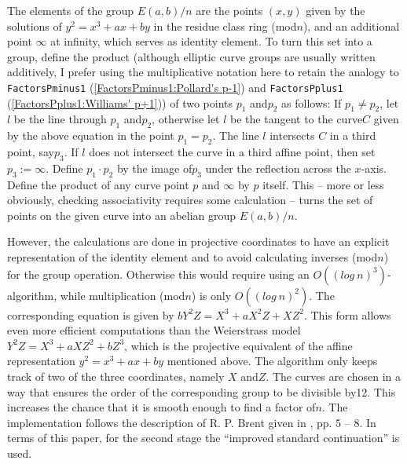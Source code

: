 \documentclass[a4paper,11pt]{report}
\begin{document}
{{{ The elements of the group $E(a,b)/n$ are the points $(x,y)$ given by the solutions of $y^2 = x^3 + ax + by$ in the residue class ring (mod{\nobreakspace}$n$), and an additional point $\infty$ at infinity, which serves as identity element. To turn this set into a group,
define the product (although elliptic curve groups are usually written
additively, I prefer using the multiplicative notation here to retain the
analogy to \texttt{FactorsPminus1} (\ref{FactorsPminus1:Pollard's p-1}) and \texttt{FactorsPplus1} (\ref{FactorsPplus1:Williams' p+1})) of two points $p_1$ and{\nobreakspace}$p_2$ as follows: If $p_1 \neq p_2$, let $l$ be the line through $p_1$ and{\nobreakspace}$p_2$, otherwise let $l$ be the tangent to the curve{\nobreakspace}$C$ given by the above equation in the point $p_1 = p_2$. The line $l$ intersects $C$ in a third point, say{\nobreakspace}$p_3$. If $l$ does not intersect the curve in a third affine point, then set $p_3 := \infty$. Define $p_1 \cdot p_2$ by the image of{\nobreakspace}$p_3$ under the reflection across the $x$-axis. Define the product of any curve point $p$ and $\infty$ by $p$ itself. This -- more or less obviously, checking associativity requires some
calculation -- turns the set of points on the given curve into an abelian
group $E(a,b)/n$. 

 However, the calculations are done in  projective coordinates to have an explicit representation of the identity
element and to avoid calculating inverses (mod{\nobreakspace}$n$) for the group operation. Otherwise this would require using an $O((log \ n)^3)$-algorithm, while multiplication (mod{\nobreakspace}$n$) is only $O((log \ n)^2)$. The corresponding equation is given by $bY^2Z = X^3 + aX^2Z + XZ^2$. This form allows even more efficient computations than the  Weierstrass model $Y^2Z = X^3 + aXZ^2 + bZ^3$, which is the projective equivalent of the affine representation $y^2 = x^3 + ax + by$ mentioned above. The algorithm only keeps track of two of the three
coordinates, namely $X$ and{\nobreakspace}$Z$. The curves are chosen in a way that ensures the order of the corresponding
group to be divisible by{\nobreakspace}12. This increases the chance that it
is smooth enough to find a factor of{\nobreakspace}$n$. The implementation follows the description of R. P. Brent given in \cite{Brent96}, pp. 5 -- 8. In terms of this paper, for the second stage the ``improved standard continuation'' is used. 
\begin{Verbatim}[fontsize=\small,frame=single,label=Example]
  

\end{Verbatim}}}}
\end{document}
